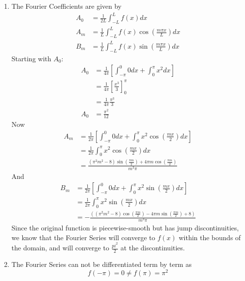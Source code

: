 \documentclass[12pt]{article}
\numberwithin{equation}{section}
\begin{document}
\begin{enumerate}
\begin{enumerate}
            \item The Fourier Coefficients are given by 
            \begin{align*}
                A_0&=\frac{1}{2L}\int_{-L}^Lf(x)dx\\
                A_m&=\frac{1}{L}\int_{-L}^L f(x)\cos(\frac{m\pi x}{L})dx\\
                B_m&=\frac{1}{L}\int_{-L}^L f(x)\sin(\frac{m\pi x}{L})dx
            \end{align*}
            Starting with $A_0$:
            \begin{align*}
                A_0&=\frac{1}{4\pi}\left[\int_{-\pi}^0 0dx+\int_0^\pi x^2 dx\right]\\
                &=\frac{1}{4\pi}\left[\frac{x^3}{3}\right]_0^\pi\\
                &=\frac{1}{4\pi}\frac{\pi^3}{3}\\
                A_0&=\frac{\pi^2}{12}
            \end{align*}
            Now 
            \begin{align*}
                A_m&=\frac{1}{2\pi}\left[\int_{-\pi}^0 0 dx +\int_{0}^\pi x^2\cos(\frac{m x}{2})dx\right]\\
                &=\frac{1}{2\pi} \int_{0}^\pi x^2\cos(\frac{m x}{2})dx\\
                &=\frac{(\pi^2m^2-8)\sin(\frac{\pi m}{2})+4\pi m\cos(\frac{\pi m}{2})}{m^3 \pi}
            \end{align*}
            And
            \begin{align*}
                B_m&=\frac{1}{2\pi}\left[\int_{-\pi}^0 0 dx +\int_{0}^\pi x^2\sin(\frac{m x}{2})dx\right]\\
                &=\frac{1}{2\pi} \int_{0}^\pi x^2\sin(\frac{m x}{2})dx\\
                &=-\frac{((\pi^2m^2-8)\cos(\frac{\pi m}{2})-4\pi m\sin(\frac{\pi m}{2})+8)}{m^3 \pi}
            \end{align*}
            Since the original function is piecewise-smooth but has jump discontinuities, we know that the Fourier Series will converge to $f(x)$ within the bounds 
            of the domain, and will converge to $\frac{pi^2}{2}$ at the discontinuities. 

            \item The Fourier Series can not be differentiated term by term as 
            \begin{equation*}
                f(-\pi)=0\neq f(\pi)=\pi^2
            \end{equation*}
        \end{enumerate}
    \end{enumerate}
\end{document}
